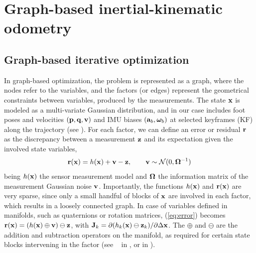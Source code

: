 
\section{Graph-based inertial-kinematic odometry}


\subsection{Graph-based iterative optimization}

In graph-based optimization, the problem is represented as a graph, where the nodes refer to the variables, and the factors (or edges) represent the geometrical constraints between variables, produced by the measurements.
%
The state ${\bf x}$ is modeled as a multi-variate Gaussian distribution, and in our case includes foot poses and velocities $({\bf p},{\bf q},{\bf v})$ and IMU biases $({\bf a}_b,{{\bm \omega}}_b)$ at selected keyframes (KF) along the trajectory (see ).
%
For each factor, we can define an error or residual ${\bf r}$ as the discrepancy between a measurement ${\bf z}$ and its expectation given the involved state variables,
%
\begin{equation}
    {\bf r}({\bf x}) = h({\bf x}) + {\bf v} - {\bf z}, \qquad {\bf v} \sim \mathcal {\mathcal{N}} (0, {\bm \Omega}^{-1})\label{eq:error}
\end{equation}
%
being $h({\bf x})$ the sensor measurement model and ${\bm \Omega}$ the information matrix of the measurement Gaussian noise ${\bf v}$.
Importantly, the functions $h({\bf x})$ and ${\bf r}({\bf x})$ are very sparse, since only a small handful of blocks of ${\bf x}$ are involved in each factor, which results in a loosely connected graph.
In case of variables defined in manifolds, such as quaternions or rotation matrices, (\ref{eq:error}) becomes ${\bf r}({\bf x}) = (h({\bf x}) \oplus {\bf v}) \ominus {\bf z}$, with ${\bf J}_k = \partial (h_k({\bf x})\ominus{\bf z}_k)/\partial \Delta {\bf x}$. 
The $\oplus$ and $\ominus$ are the addition and subtraction operators on the manifold, as required for certain state blocks intervening in the factor (see \eg~ in , or  in ).

